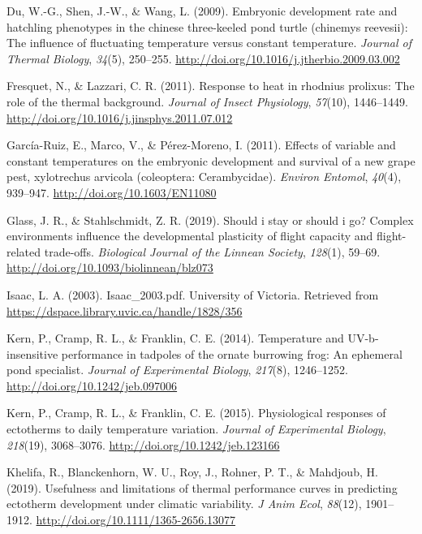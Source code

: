 \documentclass[12pt,twoside]{reedthesis}
\begin{document}
\leavevmode\hypertarget{ref-du_embryonic_2009}{}%
Du, W.-G., Shen, J.-W., \& Wang, L. (2009). Embryonic development rate and hatchling phenotypes in the chinese three-keeled pond turtle (chinemys reevesii): The influence of fluctuating temperature versus constant temperature. \emph{Journal of Thermal Biology}, \emph{34}(5), 250--255. \url{http://doi.org/10.1016/j.jtherbio.2009.03.002}

\leavevmode\hypertarget{ref-fresquet_response_2011}{}%
Fresquet, N., \& Lazzari, C. R. (2011). Response to heat in rhodnius prolixus: The role of the thermal background. \emph{Journal of Insect Physiology}, \emph{57}(10), 1446--1449. \url{http://doi.org/10.1016/j.jinsphys.2011.07.012}

\leavevmode\hypertarget{ref-garcia-ruiz_effects_2011}{}%
García-Ruiz, E., Marco, V., \& Pérez-Moreno, I. (2011). Effects of variable and constant temperatures on the embryonic development and survival of a new grape pest, xylotrechus arvicola (coleoptera: Cerambycidae). \emph{Environ Entomol}, \emph{40}(4), 939--947. \url{http://doi.org/10.1603/EN11080}

\leavevmode\hypertarget{ref-glass_should_2019}{}%
Glass, J. R., \& Stahlschmidt, Z. R. (2019). Should i stay or should i go? Complex environments influence the developmental plasticity of flight capacity and flight-related trade-offs. \emph{Biological Journal of the Linnean Society}, \emph{128}(1), 59--69. \url{http://doi.org/10.1093/biolinnean/blz073}

\leavevmode\hypertarget{ref-isaac_isaac_2003pdf_2003}{}%
Isaac, L. A. (2003). Isaac\_2003.pdf. University of Victoria. Retrieved from \url{https://dspace.library.uvic.ca/handle/1828/356}

\leavevmode\hypertarget{ref-kern_temperature_2014}{}%
Kern, P., Cramp, R. L., \& Franklin, C. E. (2014). Temperature and UV-b-insensitive performance in tadpoles of the ornate burrowing frog: An ephemeral pond specialist. \emph{Journal of Experimental Biology}, \emph{217}(8), 1246--1252. \url{http://doi.org/10.1242/jeb.097006}

\leavevmode\hypertarget{ref-kern_physiological_2015-3}{}%
Kern, P., Cramp, R. L., \& Franklin, C. E. (2015). Physiological responses of ectotherms to daily temperature variation. \emph{Journal of Experimental Biology}, \emph{218}(19), 3068--3076. \url{http://doi.org/10.1242/jeb.123166}

\leavevmode\hypertarget{ref-khelifa_usefulness_2019}{}%
Khelifa, R., Blanckenhorn, W. U., Roy, J., Rohner, P. T., \& Mahdjoub, H. (2019). Usefulness and limitations of thermal performance curves in predicting ectotherm development under climatic variability. \emph{J Anim Ecol}, \emph{88}(12), 1901--1912. \url{http://doi.org/10.1111/1365-2656.13077}
\end{document}

